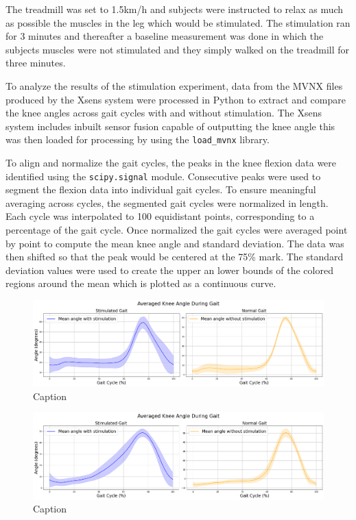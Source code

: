 
The treadmill was set to 1.5km/h and subjects were instructed to relax as much as possible the muscles in the leg which would be stimulated. The stimulation ran for 3 minutes and thereafter a baseline measurement was done in which the subjects muscles were not stimulated and they simply walked on the treadmill for three minutes. 

To analyze the results of the stimulation experiment, data from the MVNX files produced by the Xsens system were processed in Python to extract and compare the knee angles across gait cycles with and without stimulation. The Xsens system includes inbuilt sensor fusion capable of outputting the knee angle this was then loaded for processing by using the \texttt{load\_mvnx} library. 

To align and normalize the gait cycles, the peaks in the knee flexion data were identified using the \texttt{scipy.signal} module. Consecutive peaks were used to segment the flexion data into individual gait cycles. To ensure meaningful averaging across cycles, the segmented gait cycles were normalized in length. Each cycle was interpolated to 100 equidistant points, corresponding to a percentage of the gait cycle. Once normalized the gait cycles were averaged point by point to compute the mean knee angle and standard deviation. The data was then shifted so that the peak would be centered at the 75\% mark. The standard deviation values were used to create the upper an lower bounds of the colored regions around the mean which is plotted as a continuous curve. 






\begin{figure}[h]
    \centering
    \includegraphics[width=0.95\linewidth]{images/alexisoutput1.png}
    \caption{Caption}
    \label{fig:enter-label}
\end{figure}

\begin{figure}[h]
    \centering
    \includegraphics[width=0.95\linewidth]{images/katlaoutput1.png}
    \caption{Caption}
    \label{fig:enter-label}
\end{figure}

